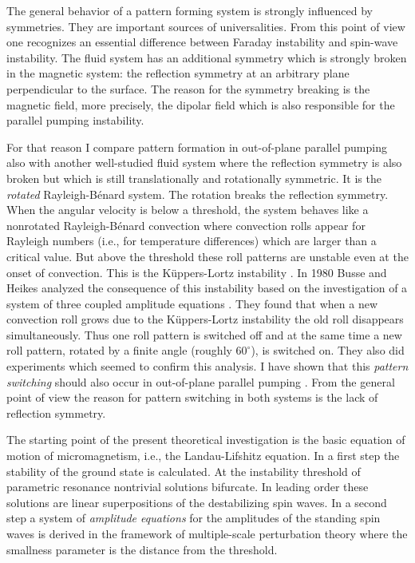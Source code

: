 The general behavior of a pattern forming system is strongly
influenced by symmetries. They are important sources of
universalities. From this point of view one recognizes an essential 
difference between Faraday instability and spin-wave instability.
The fluid system has an additional symmetry which is strongly broken
in the magnetic system: the reflection symmetry at an arbitrary plane
perpendicular to the surface. The reason for the symmetry breaking is
the magnetic field, more precisely, the dipolar field which is also
responsible for the parallel pumping instability.

For that reason I compare pattern formation in out-of-plane parallel
pumping also with another well-studied fluid system where the
reflection symmetry is also broken but which is still translationally
and rotationally symmetric. It is the {\em rotated\/}
Rayleigh-B\'enard system. The rotation breaks the reflection
symmetry. When the angular velocity is below a threshold, the system
behaves like a nonrotated Rayleigh-B\'enard convection where
convection rolls appear for Rayleigh numbers (i.e., for temperature
differences) which are larger than a critical value. But above the
threshold these roll patterns are unstable even at the onset of
convection.  This is the K\"uppers-Lortz instability \cite{kue.69}.
In 1980 Busse and Heikes analyzed the consequence of this instability
based on the investigation of a system of three coupled amplitude
equations \cite{bus.80}. They found that when a new convection roll
grows due to the K\"uppers-Lortz instability the old roll disappears
simultaneously. Thus one roll pattern is switched off and at the same
time a new roll pattern, rotated by a finite angle (roughly
$60^\circ$), is switched on. They also did experiments which seemed
to confirm this analysis. I have shown that this {\em pattern
switching\/} should also occur in out-of-plane parallel pumping
\cite{elm.95}. From the general point of view the reason for pattern
switching in both systems is the lack of reflection symmetry.

The starting point of the present theoretical investigation is the
basic equation of motion of micromagnetism, i.e., the Landau-Lifshitz
equation. In a first step the stability of the ground state is
calculated. At the instability threshold of parametric resonance
nontrivial solutions bifurcate. In leading order these solutions are
linear superpositions of the destabilizing spin waves. In a second
step a system of {\em amplitude equations\/} for the amplitudes of
the standing spin waves is derived in the framework of multiple-scale
perturbation theory where the smallness parameter is the distance
from the threshold. 

